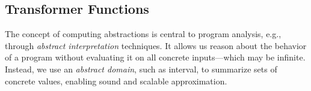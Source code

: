 \documentclass[oneside,11pt,dvipsnames]{book}
\numberwithin{equation}{section}
\theoremstyle{definition}
\theoremstyle{remark}
\newcommand{\tvn}[1]{\iftoggle{usecomment}{{\color{red}{[TVN]: #1}}}{}}
\begin{document}





\subsection{Transformer Functions}

The concept of computing abstractions is central to program analysis, e.g., through \emph{abstract interpretation} techniques. 
It allows us reason about the behavior of a program without evaluating it on all concrete inputs---which may be infinite. Instead, we use an \emph{abstract domain}, such as interval, to summarize sets of concrete values, enabling sound and scalable approximation.
\end{document}
